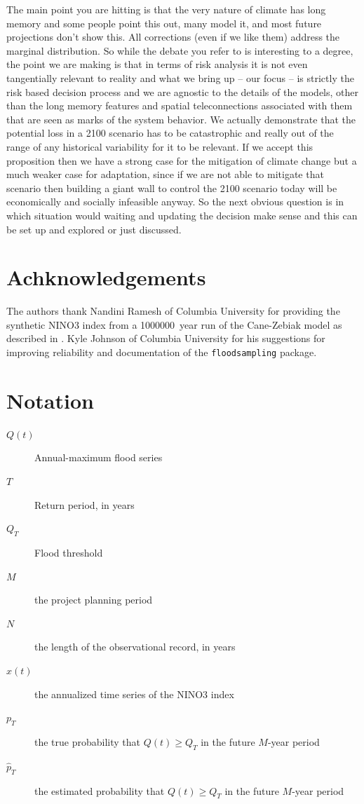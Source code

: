 \documentclass[11pt]{article}
\begin{document}
The main point you are hitting is that the very nature of climate has long memory and some people point this out, many model it, and most future projections don't show this.
All corrections (even if we like them) address the marginal distribution.
So while the debate you refer to is interesting to a degree, the point we are making is that in terms of risk analysis it is not even tangentially relevant to reality and what we bring up -- our focus -- is strictly the risk based decision process and we are agnostic to the details of the models, other than the long memory features and spatial teleconnections associated with them that are seen as marks of the system behavior.
We actually demonstrate that the potential loss in a 2100 scenario has to be catastrophic and really out of the range of any historical variability for it to be relevant.
If we accept this proposition then we have a strong case for the mitigation of climate change but a much weaker case for adaptation, since if we are not able to mitigate that scenario then building a giant wall to control the 2100 scenario today will be economically and socially infeasible anyway.
So the next obvious question is in which situation would waiting and updating the decision make sense and this can be set up and explored or just discussed.


\appendix
\printbibliography{}

\section{Achknowledgements}

The authors thank Nandini Ramesh of Columbia University for providing the synthetic NINO3 index from a \SI{1000000}{year} run of the Cane-Zebiak model as described in \citet{Ramesh2017}.
Kyle Johnson of Columbia University for his suggestions for improving reliability and documentation of the \texttt{floodsampling} package.

\section{Notation}

\begin{description}
  \item[\( Q(t) \)] Annual-maximum flood series
  \item[\( T \)] Return period, in years
  \item[\( Q_T \)] Flood threshold
  \item[\( M \)] the project planning period
  \item[\( N \)] the length of the observational record, in years
  \item[\( x(t) \)] the annualized time series of the NINO3 index
  \item[\( p_T \)] the true probability that \( Q(t) \geq Q_T \) in the future \(M\)-year period
  \item[\( \hat{p}_T \)] the estimated probability that \( Q(t) \geq Q_T \) in the future \(M\)-year period
\end{description}
\end{document}

